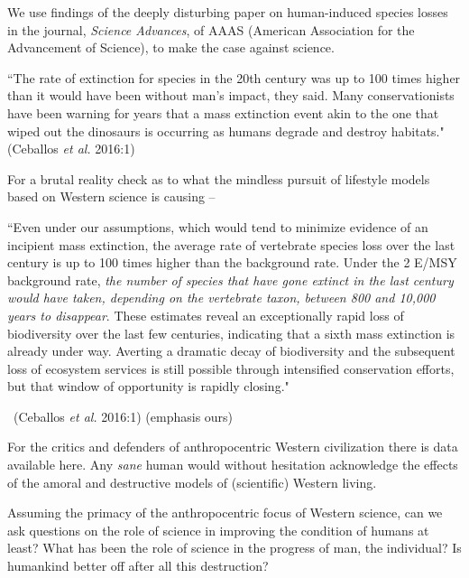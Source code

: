 We use findings of the deeply disturbing paper on human-induced species losses in the journal, \textit{Science Advances}, of AAAS (American Association for the Advancement of Science), to make the case against science.

\begin{myquote}
“The rate of extinction for species in the 20th century was up to 100 times higher than it would have been without man’s impact, they said. Many conservationists have been warning for years that a mass extinction event akin to the one that wiped out the dinosaurs is occurring as humans degrade and destroy habitats." \hfill (Ceballos \textit{et al.} 2016:1)
\end{myquote}

For a brutal reality check as to what the mindless pursuit of lifestyle models based on Western science is causing –

\begin{myquote}
“Even under our assumptions, which would tend to minimize evidence of an incipient mass extinction, the average rate of vertebrate species loss over the last century is up to 100 times higher than the background rate. Under the 2 E/MSY background rate, \textit{the number of species that have gone extinct in the last century would have taken, depending on the vertebrate taxon, between 800 and 10,000 years to disappear}. These estimates reveal an exceptionally rapid loss of biodiversity over the last few centuries, indicating that a sixth mass extinction is already under way. Averting a dramatic decay of biodiversity and the subsequent loss of ecosystem services is still possible through intensified conservation efforts, but that window of opportunity is rapidly closing." 

~\hfill (Ceballos \textit{et al.} 2016:1) (emphasis ours)
\end{myquote}

For the critics and defenders of anthropocentric Western civilization there is data available here. Any \textit{sane} human would without hesitation acknowledge the effects of the amoral and destructive models of (scientific) Western living.

Assuming the primacy of the anthropocentric focus of Western science, can we ask questions on the role of science in improving the condition of humans at least? What has been the role of science in the progress of man, the individual? Is humankind better off after all this destruction?

